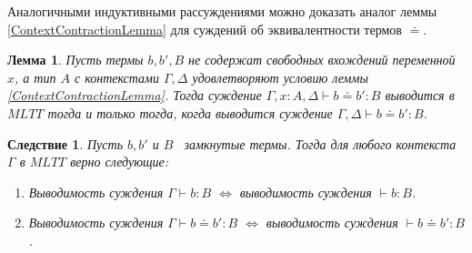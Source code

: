 \documentclass{article}[12pt]
\newtheorem{lemma}{Лемма}
\newtheorem{corollary}{Следствие}
\newcommand{\dash}{\textemdash\ }
\begin{document}
Аналогичными индуктивными рассуждениями можно доказать аналог леммы \ref{ContextContractionLemma} для
суждений об эквивалентности термов $\doteq$.
\begin{lemma}
    \label{ContextContractionEqLemma}
    Пусть термы $b, b', B$ не содержат свободных вхождений переменной $x$, а тип $A$ с контекстами
    $\Gamma, \Delta$ удовлетворяют условию леммы \ref{ContextContractionLemma}. Тогда суждение
    $\Gamma, x : A, \Delta \vdash b \doteq b' : B$ выводится в $MLTT$ тогда и только тогда, когда
    выводится суждение $\Gamma, \Delta \vdash b \doteq b' : B$.
\end{lemma}

\begin{corollary}
    Пусть $b, b'$ и $B$ \dash замкнутые термы. Тогда для любого контекста $\Gamma$ в $MLTT$
    верно следующие:
    \begin{enumerate}
        \item Выводимость суждения $\Gamma \vdash b : B$ $\iff$ выводимость суждения $\vdash b : B$.
        \item Выводимость суждения $\Gamma \vdash b \doteq b' : B$ $\iff$ выводимость суждения $\vdash b \doteq b' : B$.
    \end{enumerate}
\end{corollary}
\end{document}
